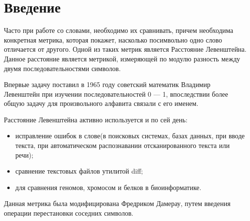 \chapter*{Введение}

Часто при работе со словами, необходимо их сравнивать, причем необходима конкретная метрика, которая покажет, насколько посимвольно одно слово отличается от другого.
Одной из таких метрик является Расстояние Левенштейна.
Данное расстояние является метрикой, измеряющей по модулю разность между двумя последовательностями символов.

Впервые задачу поставил в 1965 году советский математик Владимир Левенштейн при изучении последовательностей 0 --- 1, впоследствии более общую задачу для произвольного алфавита связали с его именем.

Расстояние Левенштейна активно используется и по сей день:
\begin{itemize}[label=---]
	\item исправление ошибок в слове(в поисковых системах, базах данных, при вводе текста, при автоматическом распознавании отсканированного текста или речи);
	\item сравнение текстовых файлов утилитой diff;
	\item для сравнения геномов, хромосом и белков в биоинформатике.
\end{itemize}

Данная метрика была модифицирована Фредриком Дамерау, путем введения операции перестановки соседних символов.


